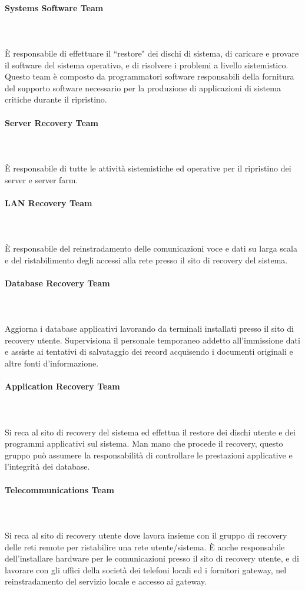 \documentclass[12pt, a4paper, titlepage]{report}
\newcommand{\myparagraph}[1]{\paragraph{#1}\mbox{} \mbox{}}
\begin{document}
			\myparagraph{Systems Software Team}\\
			\\È responsabile di effettuare il ``restore" dei dischi di sistema, di caricare e provare il software del sistema operativo, e di risolvere i problemi a livello sistemistico.
			Questo team è composto da programmatori software responsabili della fornitura del supporto software necessario per la produzione di applicazioni di sistema critiche durante il ripristino.
			
			\myparagraph{Server Recovery Team}\\
			\\È responsabile di tutte le attività sistemistiche ed operative per il ripristino dei server e server farm.
			
			
			\myparagraph{LAN Recovery Team}\\
			\\È responsabile del reinstradamento delle comunicazioni voce e dati su larga scala e del ristabilimento degli accessi alla rete presso il sito di recovery del sistema.
			
			\myparagraph{Database Recovery Team}\\
			\\Aggiorna i database applicativi lavorando da terminali installati presso il sito di recovery utente. Supervisiona il personale temporaneo addetto all'immissione dati e assiste ai tentativi di salvataggio dei record acquisendo i documenti originali e altre fonti d'informazione.
			
			
			\myparagraph{Application Recovery Team}\\
			\\Si reca al sito di recovery del sistema ed effettua il restore dei dischi utente e dei programmi applicativi sul sistema. Man mano che procede il recovery, questo gruppo può assumere la responsabilità di controllare le prestazioni applicative e l'integrità dei database.
			
			
			\myparagraph{Telecommunications Team}\\
			\\Si reca al sito di recovery utente dove lavora insieme con il gruppo di recovery delle reti remote per ristabilire una rete utente/sistema. È anche responsabile dell'installare hardware per le comunicazioni presso il sito di recovery utente, e di lavorare con gli uffici della società dei telefoni locali ed i fornitori gateway, nel reinstradamento del servizio locale e accesso ai gateway.
			
\end{document}
